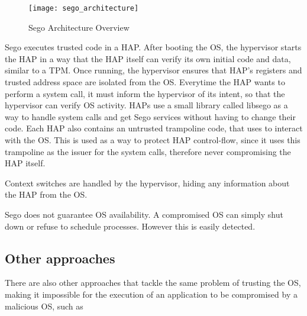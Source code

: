 \begin{figure}[htbp]
	\centering
	{\texttt{[image: sego\_architecture]}}%
	\caption{Sego Architecture Overview}
\end{figure}


Sego executes trusted code in a HAP. After booting the OS, the hypervisor starts the HAP in a way that the HAP itself can verify its own initial code and data, similar to a TPM. Once running, the hypervisor ensures that HAP's registers and trusted address space are isolated from the OS. 
Everytime the HAP wants to perform a system call, it must inform the hypervisor of its intent, so that the hypervisor can verify OS activity. HAPs use a small library called libsego as a way to handle system calls and get Sego services without having to change their code. 
Each HAP also contains an untrusted trampoline code, that uses to interact with the OS. This is used as a way to protect HAP control-flow, since it uses this trampoline as the issuer for the system calls, therefore never compromising the HAP itself.



Context switches are handled by the hypervisor, hiding any information about the HAP from the OS.

Sego does not guarantee OS availability. A compromised OS can simply shut down or refuse to schedule processes. However this is easily detected.




\subsection{Other approaches}

There are also other approaches that tackle the same problem of trusting the OS, making it impossible for the execution of an  application to be compromised by a malicious OS, such as 

